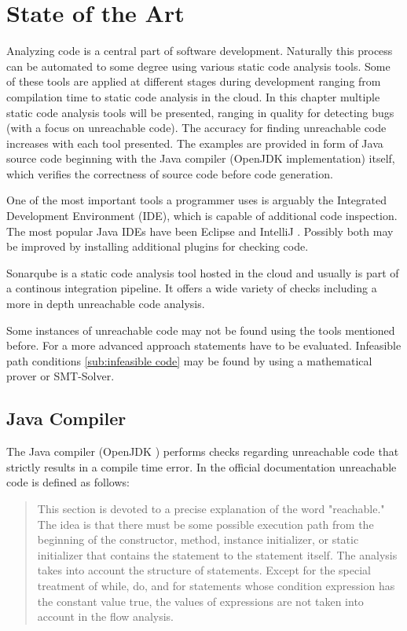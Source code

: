 
\chapter{State of the Art}
\label{cha:state of the art}

Analyzing code is a central part of software development. Naturally this process can be automated to some degree using various static code analysis tools. 
Some of these tools are applied at different stages during development ranging from compilation time to static code analysis in the cloud.
In this chapter multiple static code analysis tools will be presented, ranging in quality for detecting bugs (with a focus on unreachable code).
The accuracy for finding unreachable code increases with each tool presented. 
The examples are provided in form of Java source code beginning with the Java compiler (OpenJDK \cite{OpenJDK} implementation) itself, which verifies the correctness of source code before code generation. 


One of the most important tools a programmer uses is arguably the Integrated Development Environment (IDE), which is capable of additional code inspection. 
The most popular Java IDEs have been Eclipse \cite{incCommunityOpenInnovation} and IntelliJ \cite{IntelliJIDEACapable}. 
Possibly both may be improved by installing additional plugins for checking code.


Sonarqube \cite{sonarqube} is a static code analysis tool hosted in the cloud and usually is part of a continous integration pipeline. It offers a wide variety of checks including a more in depth unreachable code analysis.


Some instances of unreachable code may not be found using the tools mentioned before. For a more advanced approach statements have to be evaluated. Infeasible path conditions \ref{sub:infeasible code} may be found by using a mathematical prover or SMT-Solver.
\clearpage
\pagebreak
\section{Java Compiler}
\label{sec:Java compiler}

The Java compiler (OpenJDK \cite{OpenJDK}) performs checks regarding unreachable code that strictly results in a compile time error. 
In the official documentation \cite{Chapter14Blocks} unreachable code is defined as follows:
\begin{quote}
\label{quote:Java unreachable definition}
This section is devoted to a precise explanation of the word "reachable." 
The idea is that there must be some possible execution path from the beginning of the constructor, method, instance initializer, or static initializer that contains the statement to the statement itself. The analysis takes into account the structure of statements. Except for the special treatment of while, do, and for statements whose condition expression has the constant value true, the values of expressions are not taken into account in the flow analysis.
\end{quote}

